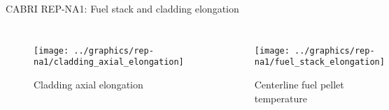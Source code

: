 \begin{frame}{CABRI REP-NA1: Fuel stack and cladding elongation}
  \footnotesize 
  
  \begin{columns}[t]


  \begin{figure}[h]
    \texttt{[image: ../graphics/rep-na1/cladding\_axial\_elongation]}
    \caption{Cladding axial elongation}
  \end{figure}  


  \begin{figure}[h]
    \texttt{[image: ../graphics/rep-na1/fuel\_stack\_elongation]}
    \caption{Centerline fuel pellet temperature}
  \end{figure}  
  
  \end{columns}

\end{frame}
